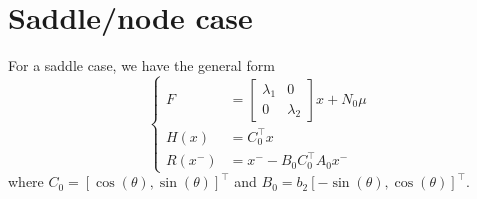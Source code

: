 \documentclass{article}
\begin{document}
\section{Saddle/node case}
For a saddle case, we have the general form 
\begin{equation}
	\begin{cases}
		F &= \begin{bmatrix}
			\lambda_1 & 0
			\\
			0  & \lambda_2
		\end{bmatrix} x + N_0 \mu
		\\
		H(x) &= C_0^{\top}x  
		\\
		R(x^-) &= x^- - B_0 C_0^{\top}A_0x^-
	\end{cases}
\end{equation}
where 
$C_0 = [\cos(\theta), \sin(\theta)]^{\top}$ 
and 
$B_0 = b_2 [-\sin(\theta), \cos(\theta)]^{\top}$. 
\end{document}
